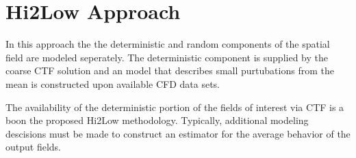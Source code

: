 
\section{Hi2Low Approach}

In this approach the the deterministic and random components of the spatial field are modeled seperately.  The deterministic component is supplied by the coarse CTF solution and an model that describes small purtubations from the mean is constructed upon available CFD data sets.

The availability of the deterministic portion of the fields of interest via CTF is a boon the proposed Hi2Low methodology.  Typically, additional modeling descisions must be made to construct an estimator for the average behavior of the output fields.
